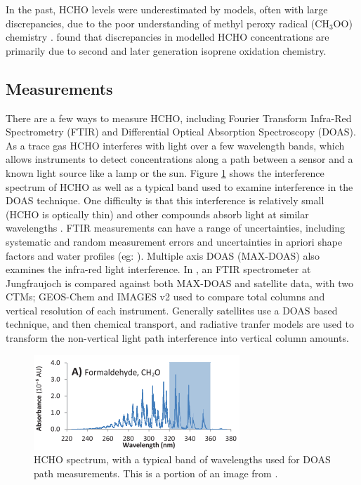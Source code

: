     In the past, HCHO levels were underestimated by models, often with large discrepancies, due to the poor understanding of methyl peroxy radical (CH$_3$OO) chemistry \citep{Wagner2002}.
    \cite{Marvin2017} found that discrepancies in modelled HCHO concentrations are primarily due to second and later generation isoprene oxidation chemistry.
    
    
  \subsection{Measurements}
    There are a few ways to measure HCHO, including Fourier Transform Infra-Red Spectrometry (FTIR) and Differential Optical Absorption Spectroscopy (DOAS).
    As a trace gas HCHO interferes with light over a few wavelength bands, which allows instruments to detect concentrations along a path between a sensor and a known light source like a lamp or the sun.
    Figure \ref{ch_LitRev:fig:HCHOSpectrum} shows the interference spectrum of HCHO as well as a typical band used to examine interference in the DOAS technique.
    One difficulty is that this interference is relatively small (HCHO is optically thin) and other compounds absorb light at similar wavelengths \citep{Davenport2015}.
    FTIR measurements can have a range of uncertainties, including systematic and random measurement errors and uncertainties in apriori shape factors and water profiles (eg: \citet{Franco2015}).
    Multiple axis DOAS (MAX-DOAS) also examines the infra-red light interference.
    In \citet{Franco2015}, an FTIR spectrometer at Jungfraujoch is compared against both MAX-DOAS and satellite data, with two CTMs; GEOS-Chem and IMAGES v2 used to compare total columns and vertical resolution of each instrument.
    Generally satellites use a DOAS based technique, and then chemical transport, and radiative tranfer models are used to transform the non-vertical light path interference into vertical column amounts.
    
    \begin{figure}
      \includegraphics{Figures/HCHO/HCHOAbsorbanceDavenport.png}
      \caption{ HCHO spectrum, with a typical band of wavelengths used for DOAS path measurements.
	This is a portion of an image from \citet{Davenport2015}.}
      \label{ch_LitRev:fig:HCHOSpectrum}
    \end{figure}
    
